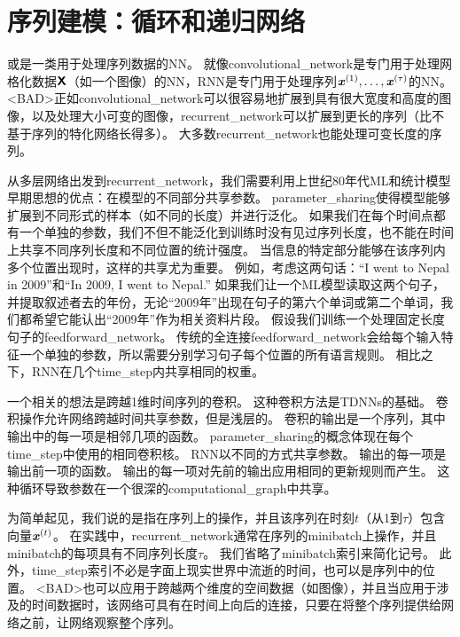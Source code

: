 \chapter{序列建模：循环和递归网络}
\label{chap:sequence_modeling_recurrent_and_recursive_nets}
或\citep{RHW}是一类用于处理序列数据的\gls{NN}。
就像\gls{convolutional_network}是专门用于处理网格化数据$\textsf{\textbf{X}}$（如一个图像）的\gls{NN}，\gls{RNN}是专门用于处理序列$\boldsymbol{\mathit{x}}^{(1)}, \dots, \boldsymbol{\mathit{x}}^{(\tau)}$的\gls{NN}。
<BAD>正如\gls{convolutional_network}可以很容易地扩展到具有很大宽度和高度的图像，以及处理大小可变的图像，\gls{recurrent_network}可以扩展到更长的序列（比不基于序列的特化网络长得多）。
大多数\gls{recurrent_network}也能处理可变长度的序列。 



从多层网络出发到\gls{recurrent_network}，我们需要利用上世纪80年代\gls{ML}和统计模型早期思想的优点：在模型的不同部分共享参数。
\gls{parameter_sharing}使得模型能够扩展到不同形式的样本（如不同的长度）并进行泛化。
如果我们在每个时间点都有一个单独的参数，我们不但不能泛化到训练时没有见过序列长度，也不能在时间上共享不同序列长度和不同位置的统计强度。
当信息的特定部分能够在该序列内多个位置出现时，这样的共享尤为重要。
例如，考虑这两句话：``I went to Nepal in 2009''和``In 2009, I went to Nepal.'' 
如果我们让一个\gls{ML}模型读取这两个句子，并提取叙述者去的年份，无论``2009年''出现在句子的第六个单词或第二个单词，我们都希望它能认出``2009年''作为相关资料片段。
假设我们训练一个处理固定长度句子的\gls{feedforward_network}。
传统的全连接\gls{feedforward_network}会给每个输入特征一个单独的参数，所以需要分别学习句子每个位置的所有语言规则。
相比之下，\gls{RNN}在几个\gls{time_step}内共享相同的权重。


一个相关的想法是跨越1维时间序列的卷积。
这种卷积方法是\gls{TDNNs}的基础\citep{Lang+Hinton88,Waibel89b,lang1990time}。
卷积操作允许网络跨越时间共享参数，但是浅层的。
卷积的输出是一个序列，其中输出中的每一项是相邻几项的函数。
\gls{parameter_sharing}的概念体现在每个\gls{time_step}中使用的相同卷积核。
\gls{RNN}以不同的方式共享参数。
输出的每一项是输出前一项的函数。
输出的每一项对先前的输出应用相同的更新规则而产生。
这种循环导致参数在一个很深的\gls{computational_graph}中共享。



为简单起见，我们说的是指在序列上的操作，并且该序列在时刻$t$（从1到$\tau$）包含向量$\boldsymbol{\mathit{x}}^{(t)}$。
在实践中，\gls{recurrent_network}通常在序列的\gls{minibatch}上操作，并且\gls{minibatch}的每项具有不同序列长度$\tau$。
我们省略了\gls{minibatch}索引来简化记号。
此外，\gls{time_step}索引不必是字面上现实世界中流逝的时间，也可以是序列中的位置。
<BAD>也可以应用于跨越两个维度的空间数据（如图像），并且当应用于涉及的时间数据时，该网络可具有在时间上向后的连接，只要在将整个序列提供给网络之前，让网络观察整个序列。



